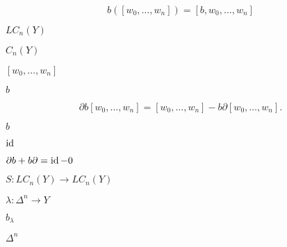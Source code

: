 \documentclass[10pt]{book}
\begin{document}
\begin{mdSnippets}
\begin{mdDisplaySnippet}[0f7a75a86de249eb8a3c2a01774ff521]
\[%
b([w_0, \dots, w_n]) = [b, w_0, \dots, w_n]
\]%
\end{mdDisplaySnippet}%
\begin{mdInlineSnippet}[f88d6e8fb0d43e67829847c05d29df9f]%
$LC_n(Y)$\end{mdInlineSnippet}%
\begin{mdInlineSnippet}[5a4e657118950703265c8ab763990e58]%
$C_n(Y)$\end{mdInlineSnippet}%
\begin{mdInlineSnippet}[8db4d2c437d6a616ae0c835ee77bbad4]%
$[w_0, \dots, w_n]$\end{mdInlineSnippet}%
\begin{mdInlineSnippet}%
$b$\end{mdInlineSnippet}%
\begin{mdDisplaySnippet}[0959f0067bc30168c314103418a9f4de]%
\[%
\partial b [w_0, \dots, w_n] = [w_0, \dots, w_n] - b \partial [w_0, \dots, w_n].
\]%
\end{mdDisplaySnippet}%
\begin{mdInlineSnippet}%
$b$\end{mdInlineSnippet}%
\begin{mdInlineSnippet}[38249f538b50785967877e7c5400afb8]%
$\operatorname{id}$\end{mdInlineSnippet}%
\begin{mdInlineSnippet}[324e3316c85b677cd99d0fa460986887]%
$\partial b + b \partial = \operatorname{id} - 0$\end{mdInlineSnippet}%
\begin{mdInlineSnippet}[c9ce6ec358e7dc9b300fd6ce0b76a9a6]%
$S: LC_n(Y) \to LC_n(Y)$\end{mdInlineSnippet}%
\begin{mdInlineSnippet}[aa25833725a95dd2ad6fe44c5c24a2a9]%
$\lambda: \Delta^n \to Y$\end{mdInlineSnippet}%
\begin{mdInlineSnippet}%
$b_\lambda$\end{mdInlineSnippet}%
\begin{mdInlineSnippet}[26ab61fa8024f78da62a405a1e574d8f]%
$\Delta^n$\end{mdInlineSnippet}%

\end{mdSnippets}
\end{document}
